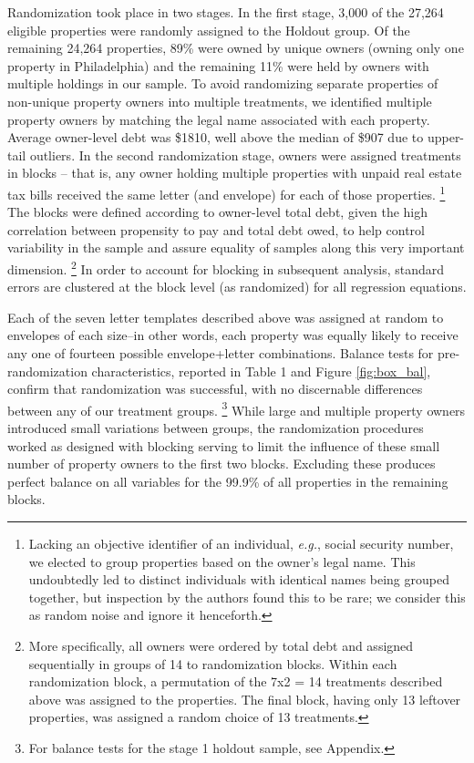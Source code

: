 \documentclass[12pt,titlepage]{article}
\begin{document}
Randomization took place in two stages. In the first stage, 3,000 
of the 27,264 eligible properties were randomly assigned 
to the Holdout group. Of the remaining 24,264 properties, 89\% were 
owned by unique owners (owning only one property in Philadelphia) and 
the remaining 11\% were held by owners with multiple holdings in our sample. To avoid 
randomizing separate properties of non-unique property owners into 
multiple treatments, we identified multiple property owners by 
matching the legal name associated with each property. Average 
owner-level debt was \$1810, well above the median of \$907 due to 
upper-tail outliers. In the second randomization stage, owners were 
assigned treatments in blocks – that is, any owner holding multiple 
properties with unpaid real estate tax bills received the same letter 
(and envelope) for each of those properties.
\footnote{
	Lacking an objective identifier of an individual, \textit{e.g.}, social 
	security number, we elected to group properties based on 
	the owner's legal name. This undoubtedly led to distinct 
	individuals with identical names being grouped together, but 
	inspection by the authors found this to be rare; we consider this 
	as random noise and ignore it henceforth.
}
The blocks were defined according to owner-level total debt, given 
the high correlation between propensity to pay and total debt owed, 
to help control variability in the sample and assure equality of 
samples along this very important dimension.
\footnote{
	More specifically, all owners were ordered by total debt and assigned 
	sequentially in groups of 14 to randomization blocks. Within each 
	randomization block, a permutation of the 7x2 = 14 treatments described 
	above was assigned to the properties. The final block, having only 13 
	leftover properties, was assigned a random choice of 13 treatments.
}
In order to account for blocking in subsequent analysis, standard errors 
are clustered at the block level (as randomized) for all regression equations. 

Each of the seven letter templates described above was assigned at random 
to envelopes of each size--in other words, each property was equally 
likely to receive any one of fourteen possible envelope+letter combinations. 
Balance tests for pre-randomization characteristics, 
reported in Table 1 and Figure \ref{fig:box_bal}, confirm that randomization was successful, 
with no discernable differences between any of our treatment groups.
\footnote{For balance tests for the stage 1 holdout sample, see Appendix.}
While large and multiple property owners introduced small variations 
between groups, the randomization procedures worked as designed with 
blocking serving to limit the influence of these small number of property 
owners to the first two blocks. Excluding these produces perfect balance 
on all variables for the 99.9\% of all properties in the remaining blocks.
\end{document}
